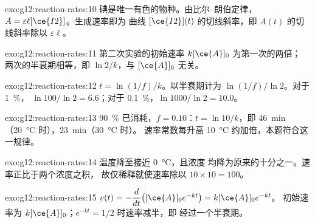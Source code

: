 \begin{solution}{exo:g12:reaction-rates:10}
碘是唯一有色的物种。由比尔–朗伯定律，
$A = \varepsilon \ell [\ce{I2}]$。生成速率即为
曲线 $[\ce{I2}](t)$ 的切线斜率，即
$A(t)$ 的切线斜率除以 $\varepsilon \ell$。
\end{solution}

\begin{solution}{exo:g12:reaction-rates:11}
第二次实验的初始速率 $k[\ce{A}]_0$ 为第一次的两倍；
两次的半衰期相等，即 $\ln 2 / k$，与 $[\ce{A}]_0$ 无关。
\end{solution}

\begin{solution}{exo:g12:reaction-rates:12}
$t = \ln(1/f)/k$。以半衰期计为 $\ln(1/f)/\ln 2$。对于 \qty{1}{\percent}，
$\ln 100 / \ln 2 = 6.6$；对于 \qty{0.1}{\percent}，$\ln 1000 / \ln 2 =
10.0$。
\end{solution}

\begin{solution}{exo:g12:reaction-rates:13}
\qty{90}{\percent} 已消耗，$f = 0.10$：$t = \ln 10 / k$，即
\qty{46}{min}（\qty{20}{\celsius} 时），\qty{23}{min}（\qty{30}{\celsius} 时）。
速率常数每升高 \qty{10}{\celsius} 约加倍，本题符合这一规律。
\end{solution}

\begin{solution}{exo:g12:reaction-rates:14}
温度降至接近 \qty{0}{\celsius}，且浓度
均降为原来的十分之一。速率正比于两个浓度之积，
故仅稀释就使速率除以 $10 \times 10 = 100$。
\end{solution}

\begin{solution}{exo:g12:reaction-rates:15}
$v(t) = -\dfrac{d}{dt}\big([\ce{A}]_0 e^{-kt}\big) = k[\ce{A}]_0 e^{-kt}$。
初始速率为 $k[\ce{A}]_0$；$e^{-kt} = 1/2$ 时速率减半，即
经过一个半衰期。
\end{solution}

